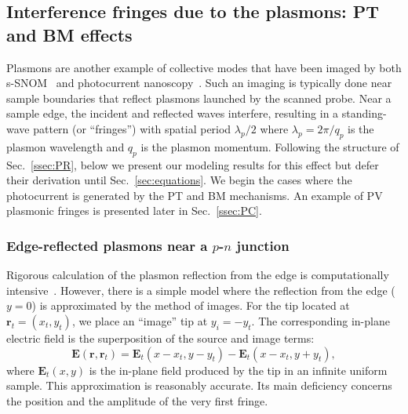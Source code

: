 \documentclass[aps, prb, reprint, superscriptaddress]{revtex4-2}
\renewcommand{\vec}{\mathbf}
\begin{document}
\subsection{Interference fringes due to the plasmons: PT and BM effects}
\label{ssec:PSW}

Plasmons are another example of collective modes that have been imaged by both s-SNOM~\cite{Fei2012, Dai2015, Chen2012,Basov2016} and photocurrent nanoscopy~\cite{AlonsoGonzalez2016, Sunku2020a}.
Such an imaging is typically done near sample boundaries that reflect plasmons launched by the scanned probe.
Near a sample edge, the incident and reflected waves interfere, resulting in a standing-wave pattern (or ``fringes'') with spatial period ${\lambda_p} / {2}$ where $\lambda_p = {2\pi} / {q_p}$ is the plasmon wavelength and 
$q_p$ is the plasmon momentum. 
Following the structure of Sec.~\ref{ssec:PR}, below we present our modeling results for this effect but defer their derivation until Sec.~\ref{sec:equations}.
We begin the cases where the photocurrent is generated by the PT and BM mechanisms.
An example of PV plasmonic fringes is presented later in Sec.~\ref{ssec:PC}.

\subsubsection{Edge-reflected plasmons near a \texorpdfstring{$p$-$n$}{} junction}
\label{sssec:PN}

Rigorous calculation of the plasmon reflection from the edge is computationally intensive~\cite{Fei2012}.
However, there is a simple model
where the reflection from the edge ($y = 0$) is approximated by the method of images.
For the tip located at $\vec{r}_t = (x_t, y_t)$, we place an ``image'' tip at $y_i = -y_t$.
The corresponding in-plane electric field is the superposition of the source and image terms:
\begin{equation}
	\vec{E}(\vec{r}, \vec{r}_t)= \vec{E}_t(x - x_t, y - y_t) - \vec{E}_t(x - x_t, y + y_t),
	\label{eqn:E_inplane_edge}
\end{equation}
where $\vec{E}_t(x, y)$ is the in-plane field produced by the tip in an infinite uniform sample.
This approximation is reasonably accurate.
Its main deficiency concerns the position and the amplitude of the very first fringe.
\end{document}
